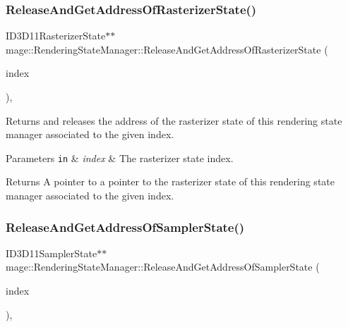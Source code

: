 \subsubsection{\texorpdfstring{Release\+And\+Get\+Address\+Of\+Rasterizer\+State()}{ReleaseAndGetAddressOfRasterizerState()}}
{\footnotesize\ttfamily I\+D3\+D11\+Rasterizer\+State$\ast$$\ast$ mage\+::\+Rendering\+State\+Manager\+::\+Release\+And\+Get\+Address\+Of\+Rasterizer\+State (\begin{DoxyParamCaption}\item[{\hyperlink{classmage_1_1_rendering_state_manager_a72211dd35c1d3968717147572ca127da}{Rasterizer\+State\+Index}}]{index }\end{DoxyParamCaption})\hspace{0.3cm}{\ttfamily [private]}, {\ttfamily [noexcept]}}

Returns and releases the address of the rasterizer state of this rendering state manager associated to the given index.


\begin{DoxyParams}[1]{Parameters}
\mbox{\tt in}  & {\em index} & The rasterizer state index. \\
\hline
\end{DoxyParams}
\begin{DoxyReturn}{Returns}
A pointer to a pointer to the rasterizer state of this rendering state manager associated to the given index. 
\end{DoxyReturn}
\hypertarget{classmage_1_1_rendering_state_manager_accd84565ba05048034ab2b2fd3a22ec7}{}\label{classmage_1_1_rendering_state_manager_accd84565ba05048034ab2b2fd3a22ec7} 
\subsubsection{\texorpdfstring{Release\+And\+Get\+Address\+Of\+Sampler\+State()}{ReleaseAndGetAddressOfSamplerState()}}
{\footnotesize\ttfamily I\+D3\+D11\+Sampler\+State$\ast$$\ast$ mage\+::\+Rendering\+State\+Manager\+::\+Release\+And\+Get\+Address\+Of\+Sampler\+State (\begin{DoxyParamCaption}\item[{\hyperlink{classmage_1_1_rendering_state_manager_ad756bcfaf65de7ce2a7ac46e0ba97557}{Sampler\+State\+Index}}]{index }\end{DoxyParamCaption})\hspace{0.3cm}{\ttfamily [private]}, {\ttfamily [noexcept]}}

